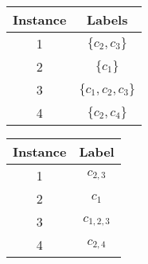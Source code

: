 \documentclass[Dissertation.tex]{subfiles}
\begin{document}
\begin{table}[]
	\centering

	\caption{Sample dataset in multi-label and label power set formats}
	\label{miniData}
	\begin{subfigure}{0.25\linewidth}
		\centering
		\begin{tabular*}{1\linewidth}{@{}cc@{}}
	
			\toprule
			Instance & Labels \\ \midrule
			1	&	$ \{c_2,c_3\} $        \\
			2	&	$ \{c_1\} $        \\
			3	&	$ \{c_1,c_2,c_3\} $        \\
			4	&	$ \{c_2, c_4\} $        \\ \bottomrule
		\end{tabular*}
	\end{subfigure}
	\qquad
	\begin{subfigure}{0.25\linewidth}
		\centering
		\begin{tabular*}{1\linewidth}{@{}cc@{}}
			
			\toprule
			Instance & Label \\ \midrule
			1	&	$ c_{2,3} $        \\
			2	&	$ c_1$        \\
			3	&	$ c_{1,2,3} $        \\
			4	&	$ c_{2,4} $        \\ \bottomrule
		\end{tabular*}
	\end{subfigure}

\vspace{3ex}


\end{table}
\end{document}
